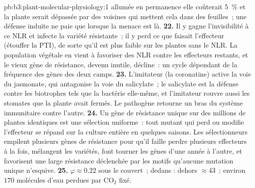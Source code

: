 \begin{solution}{pb:b3:plant-molecular-physiology:1}
allumée en permanence elle coûterait \qty{5}{\%} et la plante serait
dépassée par des voisines qui mettent cela dans des feuilles~; une
défense induite ne paie que lorsque la menace est là.
\textbf{22.} Il y gagne l'invisibilité à ce NLR et infecte la variété
résistante~; il y perd ce que faisait l'effecteur (étouffer la PTI), de
sorte qu'il est plus faible sur les plantes sans le NLR. La population
végétale en vient à favoriser des NLR contre les effecteurs restants, et
le vieux gène de résistance, devenu inutile, décline~: un cycle dépendant
de la fréquence des gènes des deux camps.
\textbf{23.} L'imitateur (la coronatine) active la voie du jasmonate,
qui antagonise la voie du salicylate~; le salicylate est la défense
contre les biotrophes tels que la bactérie elle-même, et l'imitateur
rouvre aussi les stomates que la plante avait fermés. Le pathogène
retourne un bras du système immunitaire contre l'autre.
\textbf{24.} Un gène de résistance unique sur des millions de plantes
identiques est une sélection uniforme~: tout mutant qui perd ou modifie
l'effecteur se répand sur la culture entière en quelques saisons. Les
sélectionneurs empilent plusieurs gènes de résistance pour qu'il faille
perdre plusieurs effecteurs à la fois, mélangent les variétés, font
tourner les gènes d'une année à l'autre, et favorisent une large
résistance déclenchée par les motifs qu'aucune mutation unique n'esquive.
\textbf{25.} $\varphi \approx 0.22$ sous le couvert~;  dedans :
dehors $\approx 43$~; environ $170$ molécules d'eau perdues par CO$_{2}$
fixé.
\end{solution}
